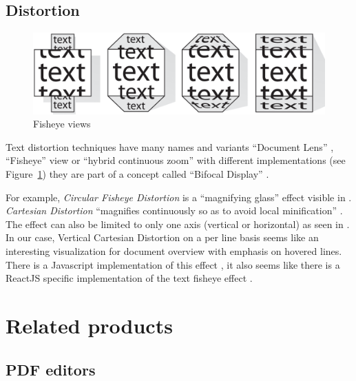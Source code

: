 \documentclass[\version]{l4proj}
\begin{document}
\subsection{Distortion}

\begin{figure}
    \includegraphics[width=\linewidth]{images/document_visualization/different-fisheyes.png}
    \caption{Fisheye views \autocite{baudischFishnetFisheyeWeb2004}
    }\label{fig:fisheyes}
    \vspace{-10pt}
\end{figure}

Text distortion techniques have many names and variants ``Document Lens'' \autocite{robertsonDocumentLens1993}, ``Fisheye'' view \autocite{greenbergFisheyeTextEditor1996} or ``hybrid continuous zoom'' \autocite{bartramContinuousZoomConstrained1995} with different implementations (see Figure~\ref{fig:fisheyes}) they are part of a concept called ``Bifocal Display'' \autocite{apperleyBifocalDisplay}.

For example, \textit{Circular Fisheye Distortion} is a ``magnifying glass'' effect visible in \textcite{bostockFisheyeGrid2019}. \textit{Cartesian Distortion} ``magnifies continuously so as to avoid local minification'' \autocite{bostockFisheyeDistortion2012}. The effect can also be limited to only one axis (vertical or horizontal) as seen in \textcite{pstuffaCartesianFisheyeDistortion2019}. In our case, Vertical Cartesian Distortion on a per line basis seems like an interesting visualization for document overview with emphasis on hovered lines. There is a Javascript implementation of this effect \autocite{pstuffaCartesianFisheyeDistortion2019}, it also seems like there is a ReactJS specific implementation of the text fisheye effect \autocite{zhongVincentdchanReactfisheye2019}.

\section{Related products}

\subsection{PDF editors}
\end{document}
